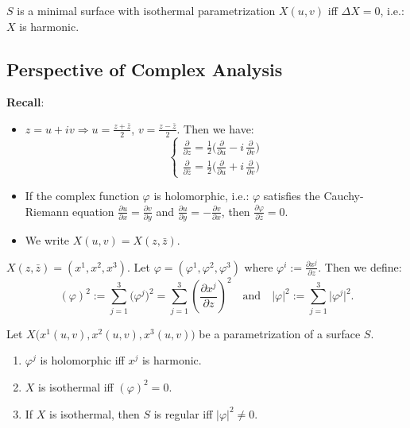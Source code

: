 \begin{corollary}
$S$ is a minimal surface with isothermal parametrization $X(u, v)$ iff $\Delta X = 0$, i.e.: $X$ is harmonic.
\end{corollary}

\subsection{Perspective of Complex Analysis}

\noindent\textbf{Recall}:
\begin{itemize}
\item $z = u + iv \Rightarrow u = \frac{z + \bar{z}}{2}$, $v = \frac{z - \bar{z}}{2}$. Then we have:
\[
\begin{cases}
\frac{\partial}{\partial z} = \frac{1}{2}\big(\frac{\partial}{\partial u} - i\,\frac{\partial}{\partial v}\big)\\[2mm]
\frac{\partial}{\partial \bar{z}} = \frac{1}{2}\big(\frac{\partial}{\partial u} + i\,\frac{\partial}{\partial v}\big)
\end{cases}
\]
\item If the complex function $\varphi$ is holomorphic, i.e.: $\varphi$ satisfies the Cauchy-Riemann equation $\frac{\partial u}{\partial x} = \frac{\partial v}{\partial y}$ and $\frac{\partial u}{\partial y} = -\frac{\partial v}{\partial x}$, then $\frac{\partial\varphi}{\partial\bar{z}} = 0$.
\item We write $X(u, v) = X(z, \bar{z})$.
\end{itemize}

$X(z, \bar{z}) = (x^1, x^2, x^3)$. Let $\varphi = (\varphi^1, \varphi^2, \varphi^3)$ where $\varphi^i := \frac{\partial x^j}{\partial z}$. Then we define:
\[
(\varphi)^2 := \sum_{j=1}^{3}\big(\varphi^j\big)^2 = \sum_{j=1}^{3}\left(\frac{\partial x^j}{\partial z}\right)^2 \quad\text{and}\quad |\varphi|^2 := \sum_{j=1}^{3}\big|\varphi^j\big|^2.
\]

\begin{proposition}
Let $X\big(x^1(u, v), x^2(u, v), x^3(u, v)\big)$ be a parametrization of a surface $S$.
\begin{enumerate}
\item $\varphi^j$ is holomorphic iff $x^j$ is harmonic.
\item $X$ is isothermal iff $(\varphi)^2 = 0$.
\item If $X$ is isothermal, then $S$ is regular iff $|\varphi|^2\neq 0$.
\end{enumerate}
\end{proposition}


